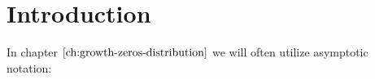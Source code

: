 \chapter{Introduction}
\label{ch:introduction}




In chapter $\ref{ch:growth-zeros-distribution}$ we will often utilize asymptotic notation:


